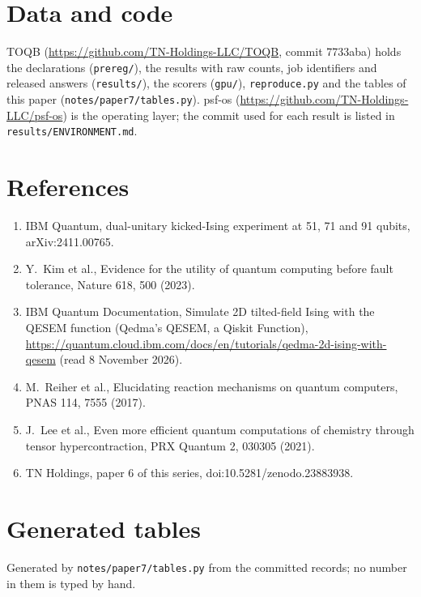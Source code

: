 \documentclass[10pt,a4paper]{article}
\begin{document}
\section*{Data and code}
TOQB (\url{https://github.com/TN-Holdings-LLC/TOQB}, commit 7733aba) holds the declarations (\texttt{prereg/}),
the results with raw counts, job identifiers and released answers (\texttt{results/}), the scorers (\texttt{gpu/}),
\texttt{reproduce.py} and the tables of this paper (\texttt{notes/paper7/tables.py}). psf-os
(\url{https://github.com/TN-Holdings-LLC/psf-os}) is the operating layer; the commit used for each result is listed
in \texttt{results/ENVIRONMENT.md}.

\section*{References}
\begin{enumerate}\small
\item IBM Quantum, dual-unitary kicked-Ising experiment at 51, 71 and 91 qubits, arXiv:2411.00765.
\item Y.~Kim et al., Evidence for the utility of quantum computing before fault tolerance, Nature 618, 500 (2023).
\item IBM Quantum Documentation, Simulate 2D tilted-field Ising with the QESEM function (Qedma's QESEM, a Qiskit
Function), \url{https://quantum.cloud.ibm.com/docs/en/tutorials/qedma-2d-ising-with-qesem} (read 8 November 2026).
\item M.~Reiher et al., Elucidating reaction mechanisms on quantum computers, PNAS 114, 7555 (2017).
\item J.~Lee et al., Even more efficient quantum computations of chemistry through tensor hypercontraction, PRX
Quantum 2, 030305 (2021).
\item TN Holdings, paper 6 of this series, doi:10.5281/zenodo.23883938.
\end{enumerate}

\appendix
\section{Generated tables}
Generated by \texttt{notes/paper7/tables.py} from the committed records; no number in them is typed by hand.
{\setlength{\tabcolsep}{3pt}
}
\end{document}
